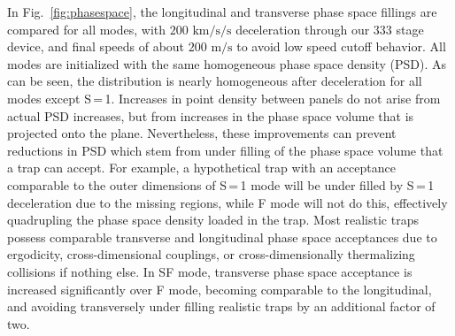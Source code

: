 \documentclass[%
 reprint,
 amsmath,amssymb,
 aps,
prl,
]{revtex4-1}
\begin{document}
In Fig.~\ref{fig:phasespace}, the longitudinal and transverse phase space fillings are compared for all modes, with $200\text{ km/s/s}$ deceleration through our $333$ stage device, and final speeds of about $200\text{ m/s}$ to avoid low speed cutoff behavior. 
All modes are initialized with the same homogeneous phase space density (PSD).
As can be seen, the distribution is nearly homogeneous after deceleration for all modes except S\,=\,1.
Increases in point density between panels do not arise from actual PSD increases, but from increases in the phase space volume that is projected onto the plane.
Nevertheless, these improvements can prevent reductions in PSD which stem from under filling of the phase space volume that a trap can accept.
For example, a hypothetical trap with an acceptance comparable to the outer dimensions of S\,=\,1 mode will be under filled by S\,=\,1 deceleration due to the missing regions, while F mode will not do this, effectively quadrupling the phase space density loaded in the trap.
Most realistic traps possess comparable transverse and longitudinal phase space acceptances due to ergodicity, cross-dimensional couplings, or cross-dimensionally thermalizing collisions if nothing else.
In SF mode, transverse phase space acceptance is increased significantly over F mode, becoming comparable to the longitudinal, and avoiding transversely under filling realistic traps by an additional factor of two.

\end{document}
